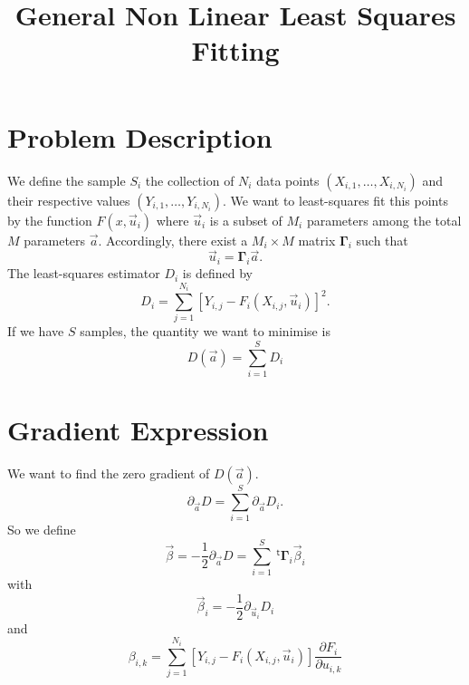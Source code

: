\documentclass[aps,twocolumn]{revtex4}
\newcommand{\mymat}[1]{\boldsymbol{#1}}
\newcommand{\mytrn}[1]{~^{\mathsf{t}}#1}
\begin{document}
\title{General Non Linear Least Squares Fitting}
\maketitle

\section{Problem Description}
We define the sample $S_i$ the collection of $N_i$ data points $(X_{i,1},\ldots,X_{i,N_i})$
and their respective values $(Y_{i,1},\ldots,Y_{i,N_i})$.
We want to least-squares fit this points by the function $F(x,\vec{u}_i)$
where $\vec{u}_i$ is a subset of $M_i$ parameters among the total $M$ parameters $\vec{a}$.
Accordingly, there exist a $M_i \times M$ matrix $\mymat{\Gamma}_i$ such that
$$
	\vec{u}_i = \mymat{\Gamma}_i \vec{a}.
$$
The least-squares estimator $D_i$ is defined by
$$
	D_i = \sum_{j=1}^{N_i} \left[Y_{i,j} - F_i\left(X_{i,j},\vec{u}_i\right) \right]^2.
$$
If we have $S$ samples,
the quantity we want to minimise is
$$
	D\left(\vec{a}\right) = \sum_{i=1}^S D_i
$$

\section{Gradient Expression}
We want to find the zero gradient of $D(\vec{a})$.
$$
	\partial_{\vec{a}} D = \sum_{i=1}^{S} \partial_{\vec{a}} D_i.
$$
So we define 
$$
	\vec{\beta} = -\dfrac{1}{2} \partial_{\vec{a}} D = \sum_{i=1}^{S} \mytrn{\mymat{\Gamma}}_i \vec{\beta}_i
$$
with
$$
	\vec{\beta}_{i} = -\dfrac{1}{2} \partial_{\vec{u}_i} D_i 
$$
and
$$
	\beta_{i,k} =	 \sum_{j=1}^{N_i}\left[Y_{i,j} - F_i\left(X_{i,j},\vec{u}_i\right) \right]\dfrac{\partial F_i}{\partial u_{i,k}}
$$
\end{document}
